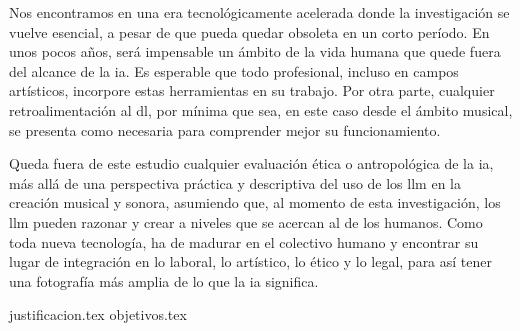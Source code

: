 Nos encontramos en una era tecnológicamente acelerada donde la investigación se vuelve esencial, a pesar de que pueda quedar obsoleta en un corto período. En unos pocos años, será impensable un ámbito de la vida humana que quede fuera del alcance de la \gls{ia}. Es esperable que todo profesional, incluso en campos artísticos, incorpore estas herramientas en su trabajo. Por otra parte, cualquier retroalimentación al \gls{dl}, por mínima que sea, en este caso desde el ámbito musical, se presenta como necesaria para comprender mejor su funcionamiento.

Queda fuera de este estudio cualquier evaluación ética o antropológica de la \gls{ia}, más allá de una perspectiva práctica y descriptiva del uso de los \gls{llm} en la creación musical y sonora, asumiendo que, al momento de esta investigación, los \gls{llm} pueden razonar y crear a niveles que se acercan al de los humanos. Como toda nueva tecnología, ha de madurar en el colectivo humano y encontrar su lugar de integración en lo laboral, lo artístico, lo ético y lo legal, para así tener una fotografía más amplia de lo que la \gls{ia} significa.


{justificacion.tex}
{objetivos.tex}